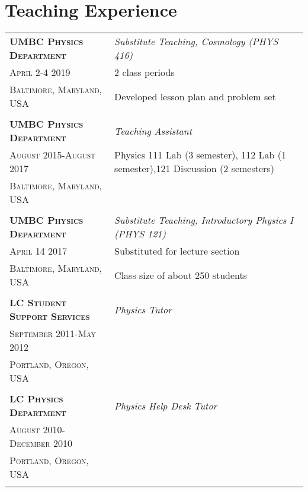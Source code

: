 %
%
%

\section{\texorpdfstring{\color{Blue}Teaching Experience}{Teaching Experience}}

\begin{longtable}{p{5cm}|p{12.3cm}}
    \textsc{\textbf{UMBC Physics Department}}& \emph{Substitute Teaching, Cosmology (PHYS 416)}\\
    \textsc{April 2-4 2019}& 2 class periods\\
    \textsc{Baltimore, Maryland, USA}& Developed lesson plan and problem set\\
    \multicolumn{2}{c}{} \\


    \textsc{\textbf{UMBC Physics Department}}& \emph{Teaching Assistant}\\
    \textsc{August 2015-August 2017}& Physics 111 Lab (3 semester), 112 Lab (1 semester),121 Discussion (2 semesters)\\
    \textsc{Baltimore, Maryland, USA}\\
    \multicolumn{2}{c}{} \\


    \textsc{\textbf{UMBC Physics Department}}& \emph{Substitute Teaching, Introductory Physics I (PHYS 121)}\\
    \textsc{April 14 2017}& Substituted for lecture section\\
    \textsc{Baltimore, Maryland, USA}& Class size of about 250 students\\
    \multicolumn{2}{c}{} \\


    \textsc{\textbf{LC Student Support Services}}& \emph{Physics Tutor}\\
    \textsc{September 2011-May 2012}&\\
    \textsc{Portland, Oregon, USA}&\\
    \multicolumn{2}{c}{} \\


    \textsc{\textbf{LC Physics Department}}& \emph{Physics Help Desk Tutor}\\
    \textsc{August 2010-December 2010}&\\
    \textsc{Portland, Oregon, USA}&\\
    \multicolumn{2}{c}{} \\



\end{longtable}
